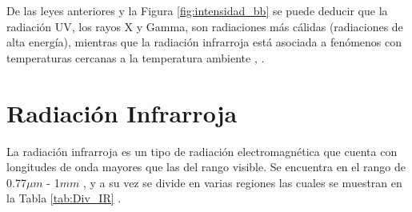     De las leyes anteriores y la Figura \ref{fig:intensidad_bb} se puede deducir que la radiación UV, los rayos X y Gamma, son radiaciones más cálidas (radiaciones de alta energía), mientras que la radiación infrarroja está asociada a fenómenos con temperaturas cercanas a la temperatura ambiente \cite{Chang}, \cite{BlancoMDA}.     
    
    \section{Radiación Infrarroja} 
    La radiación infrarroja es un tipo de radiación electromagnética que cuenta con longitudes de onda mayores que las del rango visible. Se encuentra en el rango de 0.77$\mu m$ - 1$mm$ \cite{BlancoMDA}, y a su vez se divide en varias regiones las cuales se muestran en la Tabla \ref{tab:Div_IR} \cite{Rogalski}.
    
            \begin{table}[htbp]
                \caption{División de la radiación infrarroja.}
                \begin{center}
                \label{tab:Div_IR}
                \end{center}
            \end{table}
            
            \newpage
            
